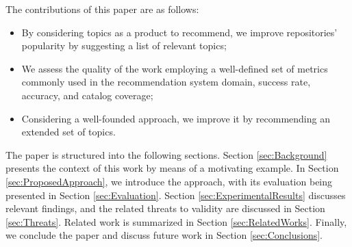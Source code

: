 
The contributions of this paper are as follows:
\begin{itemize}
	\item By considering \GH topics as a product to recommend, we improve 
	repositories' popularity by suggesting a list of relevant topics;
	\item We assess the quality of the work employing a well-defined set of 
	metrics commonly used in the recommendation system domain, \ie success rate, 
	accuracy, and catalog coverage;
	\item Considering a well-founded approach, we improve it by recommending an 
	extended set of topics.  
\end{itemize}

The paper is structured into the following sections. Section \ref{sec:Background} presents the 
context of this work by means of a motivating example. In Section 
\ref{sec:ProposedApproach}, we introduce the \TF approach, with its evaluation being 
presented in Section \ref{sec:Evaluation}. Section 
\ref{sec:ExperimentalResults} discusses relevant findings, and the related 
threats to validity are discussed in Section \ref{sec:Threats}. Related work is 
summarized in  Section \ref{sec:RelatedWorks}. Finally, we conclude the paper 
and discuss future work in Section \ref{sec:Conclusions}.
